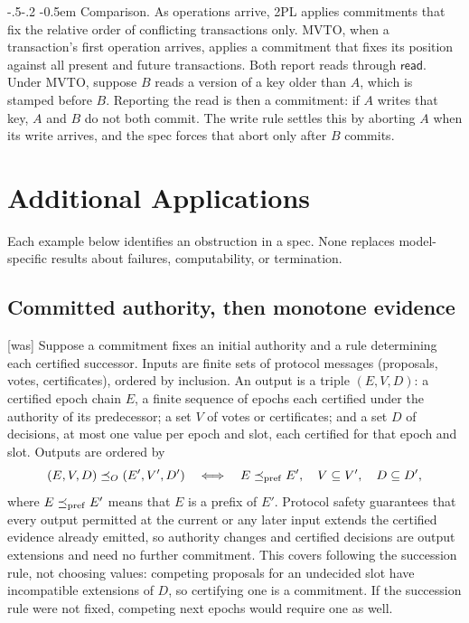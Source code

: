 \documentclass[sigconf]{cidr-2027}
\makeatletter
\theoremstyle{remark}
\renewcommand\paragraph{\@startsection{paragraph}{4}{\z@}%
  {-.5\baselineskip \@plus -2\p@ \@minus -.2\p@}%
  {-0.5em}%
  {\normalfont\bfseries}}
\newcommand{\OutputOrd}{\preceq_O}
\newcommand{\commitment}{commitment\xspace}
\newcommand{\commitments}{commitments\xspace}
\newcommand{\outrel}{extends\xspace}          %
\newcommand{\outnouns}{output extensions\xspace}
\makeatother
\begin{document}
\paragraph{Comparison.}
\color{blue!70!black}As operations arrive, 2PL applies \commitments that fix the relative order of
conflicting transactions only.  MVTO, when a transaction's first operation
arrives, applies a \commitment that fixes its position against all present and
future transactions.  Both report reads through $\mathsf{read}$.  Under MVTO,
suppose $B$ reads a version of a key older than $A$, which is stamped before
$B$.  Reporting the read is then a \commitment: if $A$ writes that key, $A$
and $B$ do not both commit.  The write rule settles this by aborting $A$ when
its write arrives, and the spec forces that abort only after $B$ commits.\color{black}

\section{Additional Applications}
\label{app:additional-applications}

Each example below identifies an obstruction in a spec.  None
replaces model-specific results about failures, computability, or
termination.

\subsection{Committed authority, then monotone evidence}



{\footnotesize\color{black!50}\noindent\textsf{[was]} Suppose a \commitment fixes an initial authority and a rule determining each
certified successor.  Inputs are finite sets of protocol messages (proposals,
votes, certificates), ordered by inclusion.  An output is a triple $(E,V,D)$:
a certified epoch chain $E$, a finite sequence of epochs each certified under
the authority of its predecessor; a set $V$ of votes or certificates; and a set
$D$ of decisions, at most one value per epoch and slot, each certified for
that epoch and slot.  Outputs are
ordered by
\begin{equation}
  (E,V,D)\OutputOrd(E',V',D')
  \quad\Longleftrightarrow\quad
  E\preceq_{\rm pref}E',\quad V\subseteq V',\quad D\subseteq D',
\end{equation}
where $E\preceq_{\rm pref}E'$ means that $E$ is a prefix of $E'$.
Protocol safety guarantees that every output permitted at the current or any
later input \outrel the certified evidence already emitted, so
authority changes and certified decisions are \outnouns and need no further
\commitment.  This covers following the succession rule, not choosing values:
competing proposals for an undecided slot have incompatible extensions of
$D$, so certifying one is a \commitment.  If the succession rule were not
fixed, competing next epochs would require one as well.\par}
\end{document}

